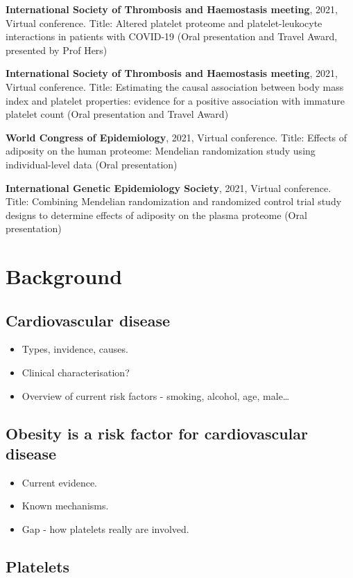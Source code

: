 \documentclass[11pt,twoside]{bristolthesis}
\providecommand{\tightlist}{%
  \setlength{\itemsep}{0pt}\setlength{\parskip}{0pt}}
\begin{document}
\textbf{International Society of Thrombosis and Haemostasis meeting}, 2021, Virtual conference. Title: Altered platelet proteome and platelet-leukocyte interactions in patients with COVID-19 (Oral presentation and Travel Award, presented by Prof Hers)

\textbf{International Society of Thrombosis and Haemostasis meeting}, 2021, Virtual conference. Title: Estimating the causal association between body mass index and platelet properties: evidence for a positive association with immature platelet count (Oral presentation and Travel Award)

\textbf{World Congress of Epidemiology}, 2021, Virtual conference. Title: Effects of adiposity on the human proteome: Mendelian randomization study using individual-level data (Oral presentation)

\textbf{International Genetic Epidemiology Society}, 2021, Virtual conference. Title: Combining Mendelian randomization and randomized control trial study designs to determine effects of adiposity on the plasma proteome (Oral presentation)

\hypertarget{background}{%
\chapter*{Background}\label{background}}

\hypertarget{cardiovascular-disease}{%
\section{Cardiovascular disease}\label{cardiovascular-disease}}
\begin{itemize}
\tightlist
\item
  Types, invidence, causes.
\item
  Clinical characterisation?
\item
  Overview of current risk factors - smoking, alcohol, age, male\ldots{}
\end{itemize}
\hypertarget{obesity-is-a-risk-factor-for-cardiovascular-disease}{%
\section{Obesity is a risk factor for cardiovascular disease}\label{obesity-is-a-risk-factor-for-cardiovascular-disease}}
\begin{itemize}
\tightlist
\item
  Current evidence.
\item
  Known mechanisms.
\item
  Gap - how platelets really are involved.
\end{itemize}
\hypertarget{platelets}{%
\section{Platelets}\label{platelets}}
\end{document}
